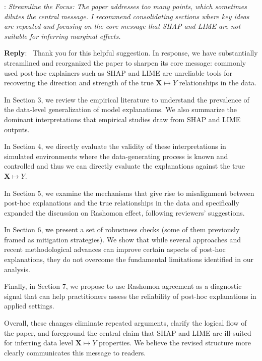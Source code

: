 \documentclass[11pt]{article}
\newcounter{se}[section]
\newcounter{reviewer}
\newcounter{point}[reviewer]
\renewcommand{\thepoint}{R\,\thereviewer.\arabic{point}}
\newenvironment{point}{
    \refstepcounter{point} \bigskip \noindent {\textbf{\thepoint}}: \rmfamily \itshape
}{\medskip}
\newenvironment{reply}
 {\par\medskip \noindent \begin{sf}\textbf{Reply}:\ }
 {\medskip \end{sf}}
\begin{document}
\begin{point}\label{r1:streamline}
Streamline the Focus: The paper addresses too many points, which sometimes dilutes the central message. I recommend consolidating sections where key ideas are repeated and focusing on the core message that SHAP and LIME are not suitable for inferring marginal effects.


\end{point}

\begin{reply}
Thank you for this helpful suggestion. In response, we have substantially streamlined and reorganized the paper to sharpen its core message: commonly used post-hoc explainers such as SHAP and LIME are unreliable tools for recovering the direction and strength of the true $\mathbf{X}\mapsto Y$ relationships in the data.

In Section 3, we review the empirical literature to understand the prevalence of the data-level generalization of model explanations. We also summarize the dominant interpretations that empirical studies draw from SHAP and LIME outputs.

In Section 4, we directly evaluate the validity of these interpretations in simulated environments where the data-generating process is known and controlled and thus we can directly evaluate the explanations against the true $\mathbf{X}\mapsto Y$.

In Section 5, we examine the mechanisms that give rise to misalignment between post-hoc explanations and the true relationships in the data and specifically expanded the discussion on Rashomon effect, following reviewers' suggestions.

In Section 6, we present a set of robustness checks (some of them previously framed as mitigation strategies). We show that while several approaches and recent methodological advances can improve certain aspects of post-hoc explanations, they do not overcome the fundamental limitations identified in our analysis.

Finally, in Section 7, we propose to use Rashomon agreement as a diagnostic signal that can help practitioners assess the reliability of post-hoc explanations in applied settings.

Overall, these changes eliminate repeated arguments, clarify the logical flow of the paper, and foreground the central claim that SHAP and LIME are ill-suited for inferring data level $\mathbf{X} \mapsto Y$ properties. We believe the revised structure more clearly communicates this message to readers.
\end{reply}
\end{document}
